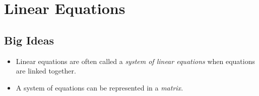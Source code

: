 \chapter{Linear Equations}
\label{chap:LE}

\section{Big Ideas}
\label{sec:LE Big Ideas}
\begin{itemize}
  \item Linear equations are often called a \emph{system of linear equations}
  when equations are linked together.
  \item A system of equations can be represented in a \emph{matrix}.
\end{itemize}